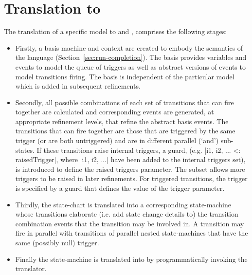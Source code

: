 
\section{\SCXML Translation to \EventB}
\label{sec:translation}

The translation of a specific \SCXML model to \UMLB and  \EventB, comprises the following stages: 
\begin{itemize}
	\item 
Firstly, a basis machine and context are created to embody the semantics of the \SCXML language (Section~\ref{sec:run-completion}).
The basis provides variables and events to model the queue of triggers as well as abstract versions of events to model transitions firing.
The basis is independent of the particular \SCXML model which is added in subsequent refinements.
	\item 
Secondly, all possible combinations of each set of transitions that can fire together are calculated and corresponding events are generated, at appropriate refinement levels, that refine the abstract basis events.
The transitions that can fire together are those that are triggered by the same trigger (or are both untriggered) and are in different parallel (`and') sub-states.
If these transitions raise internal triggers, a guard, (e.g. |{i1, i2, ...} <: raisedTrigger|, where |i1, i2, ...| have been added to the internal triggers set), is introduced to define the raised triggers parameter. 
The subset allows more triggers to be raised in later refinements.
For triggered transitions, the trigger is specified by a guard that defines the value of the trigger parameter. 
	\item 
Thirdly, the \SCXML state-chart is translated into a corresponding \UMLB state-machine whose transitions elaborate (i.e. add state change details to) the transition combination events that the transition may be involved in.
A transition may fire in parallel with transitions of parallel nested state-machines that have the same (possibly null) trigger.
	\item
Finally the \UMLB state-machine is translated into \EVENTB by programmatically invoking the \UMLB translator.
\end{itemize}


